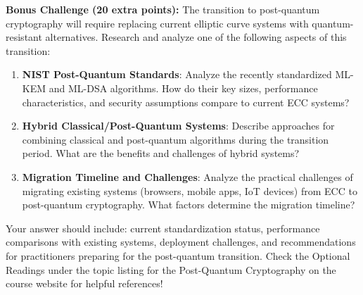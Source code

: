 \documentclass[10pt,a4paper,american]{article}
\begin{document}
\begin{tcolorbox}[colframe=EarthBrown!30!white,colback=EarthBrown!5!white]
	\textbf{Bonus Challenge (20 extra points):} The transition to post-quantum cryptography will require replacing current elliptic curve systems with quantum-resistant alternatives. Research and analyze one of the following aspects of this transition:
	\begin{enumerate}
		\item \textbf{NIST Post-Quantum Standards}: Analyze the recently standardized ML-KEM and ML-DSA algorithms. How do their key sizes, performance characteristics, and security assumptions compare to current ECC systems?
		\item \textbf{Hybrid Classical/Post-Quantum Systems}: Describe approaches for combining classical and post-quantum algorithms during the transition period. What are the benefits and challenges of hybrid systems?
		\item \textbf{Migration Timeline and Challenges}: Analyze the practical challenges of migrating existing systems (browsers, mobile apps, IoT devices) from ECC to post-quantum cryptography. What factors determine the migration timeline?
	\end{enumerate}
	Your answer should include: current standardization status, performance comparisons with existing systems, deployment challenges, and recommendations for practitioners preparing for the post-quantum transition. Check the Optional Readings under the topic listing for the Post-Quantum Cryptography on the course website for helpful references!
\end{tcolorbox}
\end{document}
